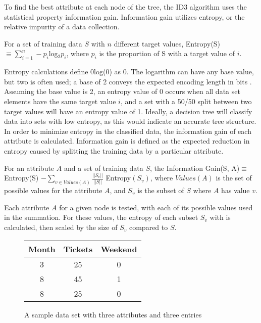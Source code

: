 To find the best attribute at each node of the tree, the ID3 algorithm uses the statistical property information gain. Information gain utilizes entropy, or the relative impurity of a data collection.
\begin{define}
  For a set of training data $S$ with $n$ different target values, Entropy(S)$\equiv\sum_{i=1}^n-p_i$log$_2p_i$, where $p_i$ is the proportion of S with a target value of $i$.
\end{define}
Entropy calculations define 0log(0) as 0. The logarithm can have any base value, but two is often used; a base of 2 conveys the expected encoding length in bits \cite{mitc97}. Assuming the base value is 2, an entropy value of 0 occurs when all data set elements have the same target value $i$, and a  set with a 50/50 split between two target values will have an entropy value of 1. Ideally, a decision tree will classify data into sets with low entropy, as this would indicate an accurate tree structure.\\

In order to minimize entropy in the classified data, the information gain of each attribute is calculated. Information gain is defined as the expected reduction in entropy caused by splitting the training data by a particular attribute.
\begin{define}
  For an attribute $A$ and a set of training data $S$, the Information Gain(S, A)$\equiv$ Entropy(S) $-\sum_{v\in Values(A)}\frac{||S_v||}{||S||}$ Entropy$(S_v)$, where $Values(A)$ is the set of possible values for the attribute $A$, and $S_v$ is the subset of $S$ where $A$ has value $v$.
\end{define}
Each attribute $A$ for a given node is tested, with each of its possible values used in the summation. For these values, the entropy of each subset $S_v$ with is calculated, then scaled by the size of $S_v$ compared to $S$.\\

\begin{figure}
  \centering
  \begin{tabular}{c | c | c}
    Month & Tickets & Weekend \\ \hline
    3 & 25 & 0 \\ \hline
    8 & 45 & 1 \\ \hline
    8 & 25 & 0 \\ \hline
  \end{tabular}
  \caption{A sample data set with three attributes and three entries}
  \label{fig:ExampleEntropy}
\end{figure}

